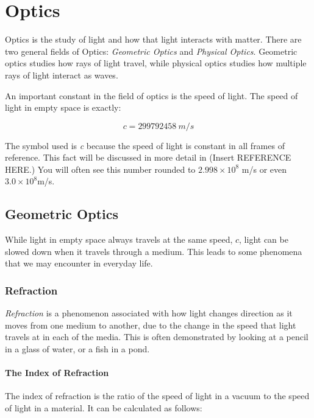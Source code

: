 \chapter{Optics}
	 Optics is the study of light and how that light interacts with matter.  There are two general fields of Optics: \textit{Geometric Optics} and \textit{Physical Optics}. Geometric optics studies how rays of light travel, while physical optics studies how multiple rays of light interact as waves.  
	
	An important constant in the field of optics is the speed of light.  The speed of light in empty space is exactly:	
	\begin{mdframed}[backgroundcolor=green!20!white]
		\begin{equation*}
		c = \SI{299792458}{m/s}
		\label{equation:speedoflight}
		\end{equation*}
	\end{mdframed}	
	
	The symbol used is \textit{c} because the speed of light is constant in all frames of reference.  This fact will be discussed in more detail in \color{red} (Insert REFERENCE  HERE.) \color{black} You will often see this number rounded to $2.998 \times 10^8$ m/s or even $3.0 \times 10^8 $m/s.
	
	
	
	
	\section{Geometric Optics} 
	
	While light in empty space always travels at the same speed, $c$, light can be slowed down when it travels through a medium.  This leads to some phenomena that we may encounter in everyday life.  
	

	\subsection{Refraction} 
		
	\textit{Refraction} is a phenomenon associated with how light changes direction as it moves from one medium to another, due to the change in the speed that light travels at in each of the media.  This is often demonstrated by looking at a pencil in a glass of water, or a fish in a pond.  
	
	\subsubsection{The Index of Refraction}
	The index of refraction  is the ratio of the speed of light in a vacuum to the speed of light in a material.  It can be calculated as follows:
	
